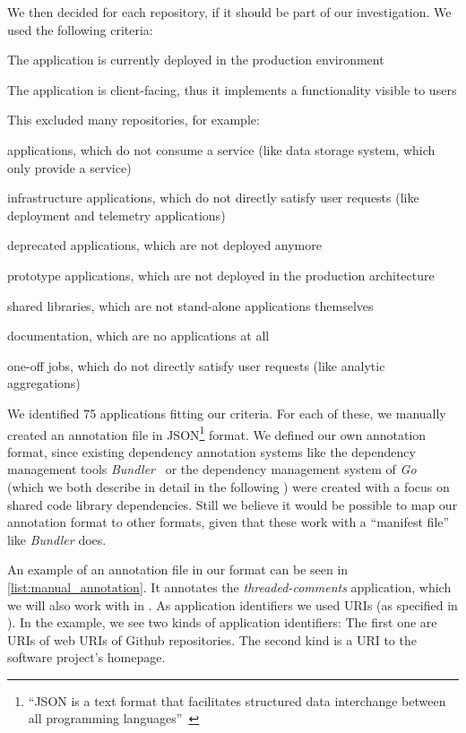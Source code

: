 We then decided for each repository, if it should be part of our investigation. We used the following criteria:
\begin{tenumerate}
  \item The application is currently deployed in the production environment
  \item The application is client-facing, thus it implements a functionality visible to users
\end{tenumerate}

This excluded many repositories, for example:
\begin{titemize}
  \item applications, which do not consume a service (like data storage system, which only provide a service)
  \item infrastructure applications, which do not directly satisfy user requests (like deployment and telemetry applications)
  \item deprecated applications, which are not deployed anymore
  \item prototype applications, which are not deployed in the production architecture
  \item shared libraries, which are not stand-alone applications themselves
  \item documentation, which are no applications at all
  \item one-off jobs, which do not directly satisfy user requests (like analytic aggregations)
\end{titemize}

We identified 75 applications fitting our criteria. For each of these, we manually created an annotation file in JSON\footnote{``JSON is a text format that facilitates structured data interchange between all programming languages''~\cite{json}} format. We defined our own annotation format, since existing dependency annotation systems like the dependency management tools \emph{Bundler}~\cite{Bundler} or the dependency management system of \emph{Go}~\cite{Go} (which we both describe in detail in the following ) were created with a focus on shared code library dependencies. Still we believe it would be possible to map our annotation format to other formats, given that these work with a ``manifest file'' like \emph{Bundler} does.

An example of an annotation file in our format can be seen in \autoref{list:manual_annotation}. It annotates the \emph{threaded-comments} application, which we will also work with in . As application identifiers we used URIs (as specified in \cite{rfc3986}). In the example, we see two kinds of application identifiers: The first one are URIs of web URIs of Github repositories. The second kind is a URI to the software project's homepage.


